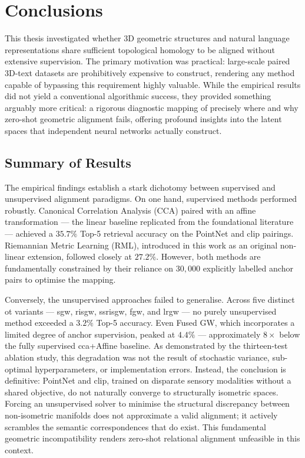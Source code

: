 \chapter{Conclusions}
\label{ch:conclusions}

This thesis investigated whether 3D geometric structures and natural language representations share sufficient topological homology to be aligned without extensive supervision. The primary motivation was practical: large-scale paired 3D-text datasets are prohibitively expensive to construct, rendering any method capable of bypassing this requirement highly valuable. While the empirical results did not yield a conventional algorithmic success, they provided something arguably more critical: a rigorous diagnostic mapping of precisely where and why zero-shot geometric alignment fails, offering profound insights into the latent spaces that independent neural networks actually construct.

\section{Summary of Results}
\label{sec:summary}

The empirical findings establish a stark dichotomy between supervised and unsupervised alignment paradigms. On one hand, supervised methods performed robustly. Canonical Correlation Analysis (CCA) paired with an affine transformation --- the linear baseline replicated from the foundational literature --- achieved a $35.7\%$ Top-5 retrieval accuracy on the PointNet and \gls{clip} pairings. Riemannian Metric Learning (RML), introduced in this work as an original non-linear extension, followed closely at $27.2\%$. However, both methods are fundamentally constrained by their reliance on $30{,}000$ explicitly labelled anchor pairs to optimise the mapping.

Conversely, the unsupervised approaches failed to generalise. Across five distinct \gls{ot} variants --- \gls{sgw}, \gls{risgw}, \gls{ssrisgw}, \gls{fgw}, and \gls{lrgw} --- no purely unsupervised method exceeded a $3.2\%$ Top-5 accuracy. Even Fused GW, which incorporates a limited degree of anchor supervision, peaked at $4.4\%$ --- approximately $8\times$ below the fully supervised \gls{cca}+Affine baseline. As demonstrated by the thirteen-test ablation study, this degradation was not the result of stochastic variance, sub-optimal hyperparameters, or implementation errors. Instead, the conclusion is definitive: PointNet and \gls{clip}, trained on disparate sensory modalities without a shared objective, do not naturally converge to structurally isometric spaces. Forcing an unsupervised solver to minimise the structural discrepancy between non-isometric manifolds does not approximate a valid alignment; it actively scrambles the semantic correspondences that do exist. This fundamental geometric incompatibility renders zero-shot relational alignment unfeasible in this context.

